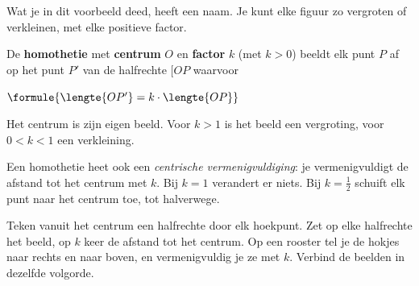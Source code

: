Wat je in dit voorbeeld deed, heeft een naam. Je kunt elke figuur zo vergroten of verkleinen, met elke positieve factor.

\begin{theorie}
De \textbf{\textcolor{accent}{homothetie}} met \textbf{\textcolor{accent}{centrum}} $O$ en \textbf{\textcolor{accent}{factor}} $k$ (met $k > 0$) beeldt elk punt $P$ af op het punt $P'$ van de halfrechte $[OP$ waarvoor

\vspace{1mm}
\qquad $\formule{\lengte{OP'} = k \cdot \lengte{OP}}$

\vspace{1mm}
Het centrum is zijn eigen beeld. Voor $k > 1$ is het beeld een vergroting, voor $0 < k < 1$ een verkleining.
\end{theorie}

Een homothetie heet ook een \emph{centrische vermenigvuldiging}: je vermenigvuldigt de afstand tot het centrum met $k$. Bij $k = 1$ verandert er niets. Bij $k = \tfrac12$ schuift elk punt naar het centrum toe, tot halverwege.


\begin{werkwijze}
Teken vanuit het centrum een halfrechte door elk hoekpunt. Zet op elke halfrechte het beeld, op $k$ keer de afstand tot het centrum. Op een rooster tel je de hokjes naar rechts en naar boven, en vermenigvuldig je ze met $k$. Verbind de beelden in dezelfde volgorde.
\end{werkwijze}

